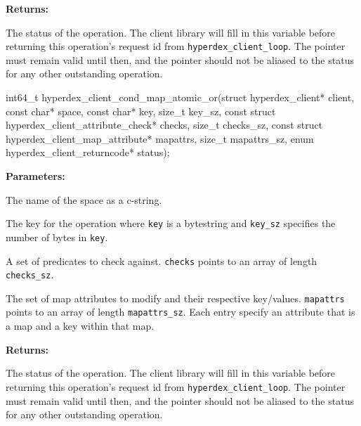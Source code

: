 \noindent\textbf{Returns:}
\begin{description}[labelindent=\widthof{{\texttt{status}}},leftmargin=*,noitemsep,nolistsep,align=right]
\item[\texttt{status}] The status of the operation.  The client library will fill in this variable before returning this operation's request id from \texttt{hyperdex\_client\_loop}.  The pointer must remain valid until then, and the pointer should not be aliased to the status for any other outstanding operation.
\end{description}

\funcsep
\begin{ccode}
int64_t hyperdex_client_cond_map_atomic_or(struct hyperdex_client* client,
                const char* space,
                const char* key, size_t key_sz,
                const struct hyperdex_client_attribute_check* checks, size_t checks_sz,
                const struct hyperdex_client_map_attribute* mapattrs, size_t mapattrs_sz,
                enum hyperdex_client_returncode* status);
\end{ccode}
\funcdesc 

\noindent\textbf{Parameters:}
\begin{description}[labelindent=\widthof{{\texttt{mapattrs}, \texttt{mapattrs\_sz}}},leftmargin=*,noitemsep,nolistsep,align=right]
\item[\texttt{space}] The name of the space as a c-string.
\item[\texttt{key}, \texttt{key\_sz}] The key for the operation where \texttt{key} is a bytestring and \texttt{key\_sz} specifies the number of bytes in \texttt{key}.
\item[\texttt{checks}, \texttt{checks\_sz}] A set of predicates to check against.  \texttt{checks} points to an array of length \texttt{checks\_sz}.
\item[\texttt{mapattrs}, \texttt{mapattrs\_sz}] The set of map attributes to modify and their respective key/values.  \texttt{mapattrs} points to an array of length \texttt{mapattrs\_sz}.  Each entry specify an attribute that is a map and a key within that map.
\end{description}

\noindent\textbf{Returns:}
\begin{description}[labelindent=\widthof{{\texttt{status}}},leftmargin=*,noitemsep,nolistsep,align=right]
\item[\texttt{status}] The status of the operation.  The client library will fill in this variable before returning this operation's request id from \texttt{hyperdex\_client\_loop}.  The pointer must remain valid until then, and the pointer should not be aliased to the status for any other outstanding operation.
\end{description}

